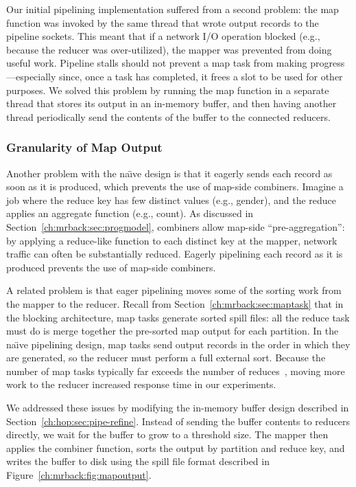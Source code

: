 Our initial pipelining implementation suffered from a second problem: the map
function was invoked by the same thread that wrote output records to the
pipeline sockets. This meant that if a network I/O operation blocked (e.g.,
because the reducer was over-utilized), the mapper was prevented from doing
useful work. Pipeline stalls should not prevent a map task from making
progress---especially since, once a task has completed, it frees a {\TT} slot
to be used for other purposes. We solved this problem by running the map
function in a separate thread that stores its output in an in-memory buffer, and
then having another thread periodically send the contents of the buffer to the
connected reducers.

\subsubsection{Granularity of Map Output}
\label{ch:hop:sec:mapout}

Another problem with the na\"{\i}ve design is that it eagerly sends
each record as soon as it is produced, which prevents the use of
map-side combiners. Imagine a job where the reduce key has few
distinct values (e.g., gender), and the reduce applies an aggregate
function (e.g., count). As discussed in Section~\ref{ch:mrback:sec:progmodel},
combiners allow map-side ``pre-aggregation'': by applying a
reduce-like function to each distinct key at the mapper, network
traffic can often be substantially reduced. Eagerly pipelining each
record as it is produced prevents the use of map-side combiners.

A related problem is that eager pipelining moves some of the sorting
work from the mapper to the reducer. Recall from Section~\ref{ch:mrback:sec:maptask}
that in the blocking architecture, map tasks generate sorted spill files: all the reduce
task must do is merge together the pre-sorted map output for each
partition. In the na\"{\i}ve pipelining design, map tasks send output
records in the order in which they are generated, so the reducer must
perform a full external sort. Because the number of map tasks
typically far exceeds the number of reduces~\cite{mapreduce-osdi},
moving more work to the reducer increased response time in our
experiments.

We addressed these issues by modifying the in-memory buffer design described in
Section~\ref{ch:hop:sec:pipe-refine}. Instead of sending the buffer contents to
reducers directly, we wait for the buffer to grow to a threshold
size. The mapper then applies the combiner function, sorts the output by
partition and reduce key, and writes the buffer to disk using the spill file
format described in Figure~\ref{ch:mrback:fig:mapoutput}.

